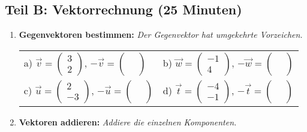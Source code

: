 \subsection*{Teil B: Vektorrechnung (25 Minuten)}

\begin{enumerate}[label=\arabic*.]

    \item \textbf{Gegenvektoren bestimmen:}
    \textit{Der Gegenvektor hat umgekehrte Vorzeichen.}
    \vspace{0.5cm}

    \begin{tabular}{ll}
        a) $\overrightarrow{v} = \begin{pmatrix} 3 \\ 2 \end{pmatrix}$, $-\overrightarrow{v} = \begin{pmatrix} \phantom{0} \\ \phantom{0} \end{pmatrix}$ & b) $\overrightarrow{w} = \begin{pmatrix} -1 \\ 4 \end{pmatrix}$, $-\overrightarrow{w} = \begin{pmatrix} \phantom{0} \\ \phantom{0} \end{pmatrix}$ \\[4ex]
        c) $\overrightarrow{u} = \begin{pmatrix} 2 \\ -3 \end{pmatrix}$, $-\overrightarrow{u} = \begin{pmatrix} \phantom{0} \\ \phantom{0} \end{pmatrix}$ & d) $\overrightarrow{t} = \begin{pmatrix} -4 \\ -1 \end{pmatrix}$, $-\overrightarrow{t} = \begin{pmatrix} \phantom{0} \\ \phantom{0} \end{pmatrix}$
    \end{tabular}

    \vspace{1cm}

    \item \textbf{Vektoren addieren:}
    \textit{Addiere die einzelnen Komponenten.}
    \vspace{0.5cm}


\end{enumerate}
